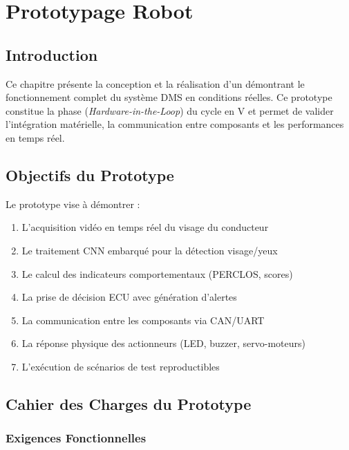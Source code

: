 
\chapter{Prototypage Robot}

\section{Introduction}

Ce chapitre présente la conception et la réalisation d'un  démontrant le fonctionnement complet du système DMS en conditions réelles. Ce prototype constitue la phase  (\textit{Hardware-in-the-Loop}) du cycle en V et permet de valider l'intégration matérielle, la communication entre composants et les performances en temps réel.

\section{Objectifs du Prototype}

Le prototype vise à démontrer :
\begin{enumerate}[leftmargin=2cm]
    \item L'acquisition vidéo en temps réel du visage du conducteur
    \item Le traitement CNN embarqué pour la détection visage/yeux
    \item Le calcul des indicateurs comportementaux (PERCLOS, scores)
    \item La prise de décision ECU avec génération d'alertes
    \item La communication entre les composants via CAN/UART
    \item La réponse physique des actionneurs (LED, buzzer, servo-moteurs)
    \item L'exécution de scénarios de test reproductibles
\end{enumerate}

\section{Cahier des Charges du Prototype}

\subsection{Exigences Fonctionnelles}

